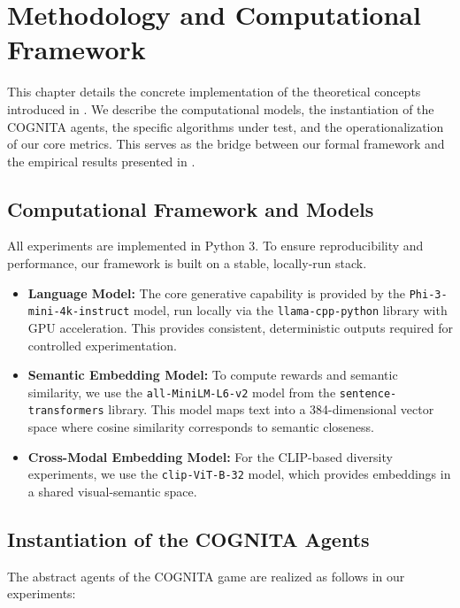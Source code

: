 \chapter{Methodology and Computational Framework}
\label{chap:methodology}

This chapter details the concrete implementation of the theoretical concepts introduced in . We describe the computational models, the instantiation of the COGNITA agents, the specific algorithms under test, and the operationalization of our core metrics. This serves as the bridge between our formal framework and the empirical results presented in .

\section{Computational Framework and Models}
All experiments are implemented in Python 3. To ensure reproducibility and performance, our framework is built on a stable, locally-run stack.

\begin{itemize}
    \item \textbf{Language Model:} The core generative capability is provided by the \texttt{Phi-3-mini-4k-instruct} model, run locally via the \texttt{llama-cpp-python} library with GPU acceleration. This provides consistent, deterministic outputs required for controlled experimentation.
    \item \textbf{Semantic Embedding Model:} To compute rewards and semantic similarity, we use the \texttt{all-MiniLM-L6-v2} model from the \texttt{sentence-transformers} library. This model maps text into a 384-dimensional vector space where cosine similarity corresponds to semantic closeness.
    \item \textbf{Cross-Modal Embedding Model:} For the CLIP-based diversity experiments, we use the \texttt{clip-ViT-B-32} model, which provides embeddings in a shared visual-semantic space.
\end{itemize}

\section{Instantiation of the COGNITA Agents}
The abstract agents of the COGNITA game are realized as follows in our experiments:

